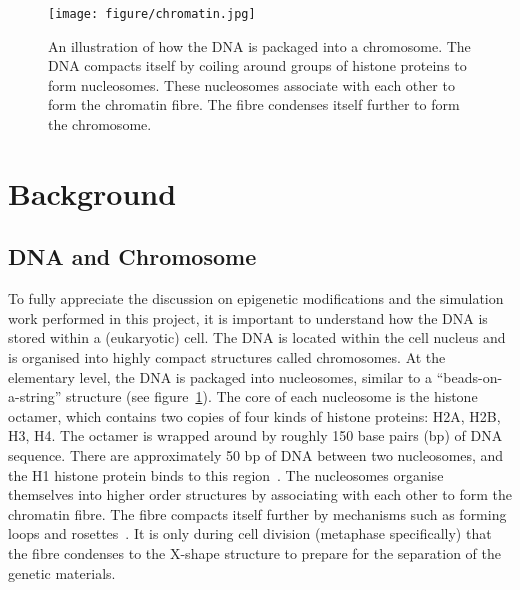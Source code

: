 \documentclass[12pt]{article}
\begin{document}
\pagebreak
\begin{figure}[h]
\centering
\texttt{[image: figure/chromatin.jpg]}
\caption{An illustration of how the DNA is packaged into a chromosome. The DNA compacts itself by coiling around groups of histone proteins to form nucleosomes. These nucleosomes associate with each other to form the chromatin fibre. The fibre condenses itself further to form the chromosome.}
\label{fig:chromosome}
\end{figure}
\section{Background}

\subsection{DNA and Chromosome}
To fully appreciate the discussion on epigenetic modifications and the simulation work performed in this project, it is important to understand how the DNA is stored within a (eukaryotic) cell. The DNA is located within the cell nucleus and is organised into highly compact structures called chromosomes. At the elementary level, the DNA is packaged into nucleosomes, similar to a ``beads-on-a-string'' structure (see figure~\ref{fig:chromosome}). The core of each nucleosome is the histone octamer, which contains two copies of four kinds of histone proteins: H2A, H2B, H3, H4. The octamer is wrapped around by roughly 150 base pairs (bp) of DNA sequence. There are approximately 50 bp of DNA between two nucleosomes, and the H1 histone protein binds to this region~\cite{DNABook}. The nucleosomes organise themselves into higher order structures by associating with each other to form the chromatin fibre. The fibre compacts itself further by mechanisms such as forming loops and rosettes~\cite{brackley2016}. It is only during cell division (metaphase specifically) that the fibre condenses to the X-shape structure to prepare for the separation of the genetic materials.  
\end{document}
